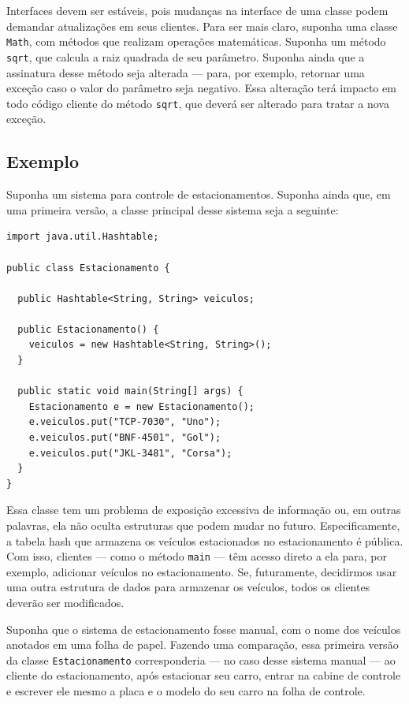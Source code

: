\documentclass[
  11pt,
  twoside]{book}
\newcommand{\passthrough}[1]{#1}
\begin{document}
Interfaces devem ser estáveis, pois mudanças na interface de uma classe
podem demandar atualizações em seus clientes. Para ser mais claro,
suponha uma classe \passthrough{\lstinline!Math!}, com métodos que
realizam operações matemáticas. Suponha um método
\passthrough{\lstinline!sqrt!}, que calcula a raiz quadrada de seu
parâmetro. Suponha ainda que a assinatura desse método seja alterada ---
para, por exemplo, retornar uma exceção caso o valor do parâmetro seja
negativo. Essa alteração terá impacto em todo código cliente do método
\passthrough{\lstinline!sqrt!}, que deverá ser alterado para tratar a
nova exceção.

\hypertarget{exemplo-1}{%
\subsection{Exemplo}\label{exemplo-1}}

Suponha um sistema para controle de estacionamentos. Suponha ainda que,
em uma primeira versão, a classe principal desse sistema seja a
seguinte:

\begin{lstlisting}
import java.util.Hashtable;

public class Estacionamento {

  public Hashtable<String, String> veiculos;

  public Estacionamento() {
    veiculos = new Hashtable<String, String>();
  }

  public static void main(String[] args) {
    Estacionamento e = new Estacionamento();
    e.veiculos.put("TCP-7030", "Uno");
    e.veiculos.put("BNF-4501", "Gol");
    e.veiculos.put("JKL-3481", "Corsa");
  }
}
\end{lstlisting}

Essa classe tem um problema de exposição excessiva de informação ou, em
outras palavras, ela não oculta estruturas que podem mudar no futuro.
Especificamente, a tabela hash que armazena os veículos estacionados no
estacionamento é pública. Com isso, clientes --- como o método
\passthrough{\lstinline!main!} --- têm acesso direto a ela para, por
exemplo, adicionar veículos no estacionamento. Se, futuramente,
decidirmos usar uma outra estrutura de dados para armazenar os veículos,
todos os clientes deverão ser modificados.

Suponha que o sistema de estacionamento fosse manual, com o nome dos
veículos anotados em uma folha de papel. Fazendo uma comparação, essa
primeira versão da classe \passthrough{\lstinline!Estacionamento!}
corresponderia --- no caso desse sistema manual --- ao cliente do
estacionamento, após estacionar seu carro, entrar na cabine de controle
e escrever ele mesmo a placa e o modelo do seu carro na folha de
controle.
\end{document}
